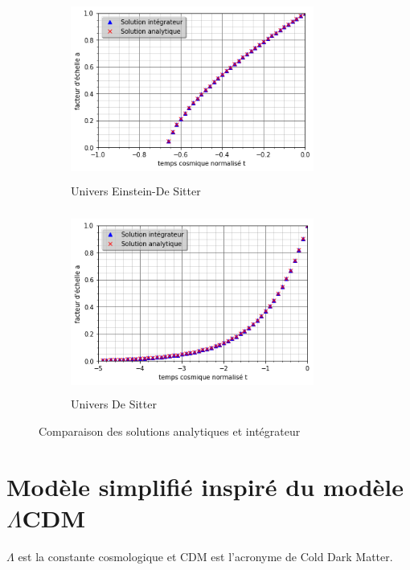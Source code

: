 \documentclass[10pt, a4paper]{report}
\numberwithin{equation}{subsection}
\begin{document}
\begin{figure}[]

\begin{subfigure}{0.5\textwidth}
\includegraphics[width=8.0cm,height=6cm]{EDSf.png}
\caption{Univers Einstein-De Sitter}
\label{fig:UEDS}
\end{subfigure}
\begin{subfigure}{0.5\textwidth}
\includegraphics[width=8.0cm,height=6cm]{DSf.png}
\caption{Univers De Sitter}
\label{fig:UDS}
\end{subfigure}

\caption{Comparaison des solutions analytiques et intégrateur}
\label{fig:UISC}
\end{figure}

\makeatletter
\renewcommand\chapter{\thispagestyle{plain}%
\global\@topnum\z@
\@afterindentfalse
\secdef\@chapter\@schapter}
\makeatother 

\section{Modèle simplifié inspiré du modèle $\Lambda$CDM}
$\Lambda$ est la constante cosmologique et CDM est l'acronyme de Cold Dark Matter. 
\end{document}
